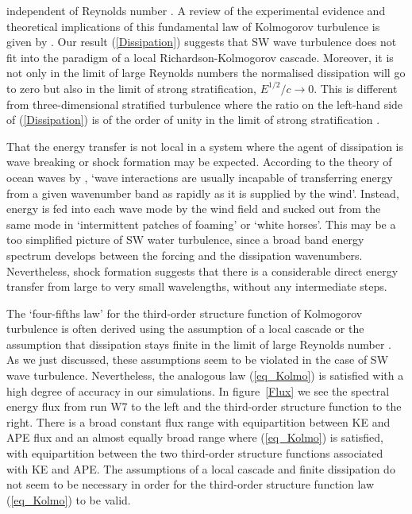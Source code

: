 independent of Reynolds number \citep[]{Pope, TennekesLumley}. A review of the
experimental evidence and theoretical implications of this fundamental law of
Kolmogorov turbulence is given by \cite{Vassilicos2015}. Our result
(\ref{Dissipation}) suggests that SW wave turbulence does not fit into the
paradigm of a local Richardson-Kolmogorov cascade. Moreover, it is not only in
the limit of large Reynolds numbers the normalised dissipation will go to zero
but also in the limit of strong stratification, $ E^{1/2}/c \rightarrow 0 $.
This is different from three-dimensional stratified turbulence where the ratio
on the left-hand side of (\ref{Dissipation}) is of the order of unity in the
limit of strong stratification \citep[]{Lindborg2006, Brethouwer2007}.

That the energy transfer is not local in a system where the agent of dissipation is wave breaking or shock formation may be expected. According to the theory of ocean waves by  \cite{Phillips},
`wave interactions are usually incapable of transferring energy from a given wavenumber
band as rapidly as it is supplied by the wind'. Instead, energy is fed into each wave mode by the
wind field and sucked out from the same mode in `intermittent patches of foaming'
or `white horses'.  This may be a too simplified picture of SW water turbulence, since a broad band energy spectrum develops between the forcing and the dissipation wavenumbers.
Nevertheless,  shock formation suggests that there is a considerable direct energy transfer from large to very small wavelengths, without any intermediate steps.


The `four-fifths law' for the third-order structure function of Kolmogorov
turbulence is often derived using the assumption of a local cascade
\citep[]{Vassilicos2015} or the assumption that dissipation stays finite in the
limit of large Reynolds number \citep[]{Frisch}. As we just discussed, these
assumptions seem to be violated in the case of SW wave turbulence.
Nevertheless, the analogous law (\ref{eq_Kolmo}) is satisfied with a high degree of accuracy in our simulations. In
figure~\ref{Flux} we see the spectral energy flux from run W7 to the left and
the third-order structure function to the right. There is a broad constant flux
range with equipartition between KE and APE flux and an almost equally broad
range where (\ref{eq_Kolmo}) is satisfied, with equipartition between the two
third-order structure functions associated with KE and APE. The assumptions of
a local cascade and finite dissipation do not seem to be necessary in order for
the third-order structure function law (\ref{eq_Kolmo}) to be valid.



